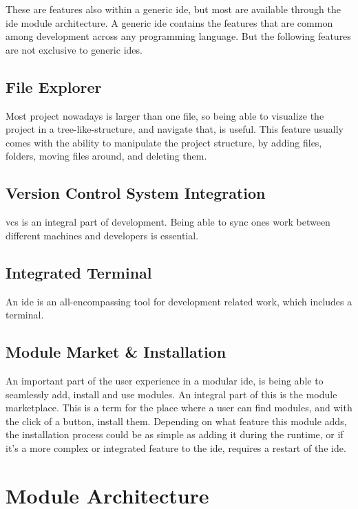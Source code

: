 These are features also within a generic \gls{ide}, but most are available
through the \gls{ide} module architecture. A generic \gls{ide} contains the
features that are common among development across any programming language. But
the following features are not exclusive to generic \gls{ide}s.

\subsection{File Explorer}

Most project nowadays is larger than one file, so being able to visualize the
project in a tree-like-structure, and navigate that, is useful. This feature
usually comes with the ability to manipulate the project structure, by adding
files, folders, moving files around, and deleting them.

\subsection{Version Control System Integration}

\gls{vcs} is an integral part of development. Being able to sync ones work
between different machines and developers is essential.

\subsection{Integrated Terminal}

An \gls{ide} is an all-encompassing tool for development related work, which
includes a terminal.

\subsection{Module Market \& Installation}

An important part of the user experience in a modular \gls{ide}, is being able
to seamlessly add, install and use modules. An integral part of this is the
module marketplace. This is a term for the place where a user can find modules,
and with the click of a button, install them. Depending on what feature this
module adds, the installation process could be as simple as adding it during the
runtime, or if it's a more complex or integrated feature to the \gls{ide},
requires a restart of the \gls{ide}.

\section{Module Architecture}

